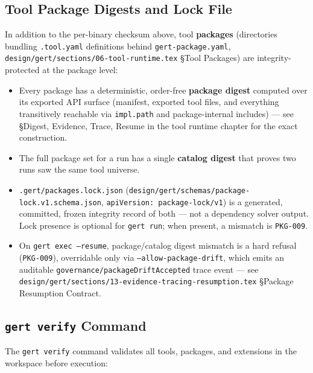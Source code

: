 \subsection{Tool Package Digests and Lock File}
\label{sec:supply-chain-package-digests}

In addition to the per-binary checksum above, tool \textbf{packages}
(directories bundling \texttt{.tool.yaml} definitions behind
\texttt{gert-package.yaml}, \texttt{design/gert/sections/06-tool-runtime.tex}
\S Tool Packages) are integrity-protected at the package level:

\begin{itemize}
  \item Every package has a deterministic, order-free \textbf{package
        digest} computed over its exported API surface (manifest, exported
        tool files, and everything transitively reachable via
        \texttt{impl.path} and package-internal includes) --- see
        \S Digest, Evidence, Trace, Resume in the tool runtime chapter for
        the exact construction.
  \item The full package set for a run has a single \textbf{catalog digest}
        that proves two runs saw the same tool universe.
  \item \texttt{.gert/packages.lock.json}
        (\texttt{design/gert/schemas/package-lock.v1.schema.json},
        \texttt{apiVersion: package-lock/v1}) is a generated, committed,
        frozen integrity record of both --- not a dependency solver output.
        Lock presence is optional for \texttt{gert run}; when present, a
        mismatch is \texttt{PKG-009}.
  \item On \texttt{gert exec --resume}, package/catalog digest mismatch is a
        hard refusal (\texttt{PKG-009}), overridable only via
        \texttt{--allow-package-drift}, which emits an auditable
        \texttt{governance/packageDriftAccepted} trace event --- see
        \texttt{design/gert/sections/13-evidence-tracing-resumption.tex}
        \S Package Resumption Contract.
\end{itemize}

\subsection{\texttt{gert verify} Command}

The \texttt{gert verify} command validates all tools, packages, and
extensions in the workspace before execution:

